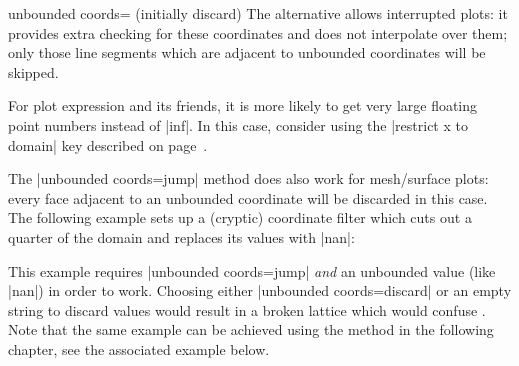 {\begin{pgfplotskey}{unbounded coords= (initially discard)}
    The alternative  allows interrupted plots: it provides
    extra checking for these coordinates and does not interpolate over them;
    only those line segments which are adjacent to unbounded coordinates will
    be skipped.
\begin{codeexample}[]
\end{codeexample}

    For plot expression and its friends, it is more likely to get very large
    floating point numbers instead of |inf|. In this case, consider using the
    |restrict x to domain| key described on
    page~\pageref{key:restrict:x:to:domain}.

    The |unbounded coords=jump| method does also work for mesh/surface plots:
    every face adjacent to an unbounded coordinate will be discarded in this
    case. The following example sets up a (cryptic) coordinate filter which
    cuts out a quarter of the domain and replaces its values with |nan|:

\pgfplotsexpensiveexample
\begin{codeexample}[]
\end{codeexample}
    \noindent This example requires
    |unbounded coords=jump|
    \emph{and} an unbounded value (like |nan|) in order to work. Choosing either
    |unbounded coords=discard| or an empty string to discard values would
    result in a broken lattice which would confuse \PGFPlots{}. Note that the
    same example can be achieved using the method in the following chapter, see
    the associated example below.
\end{pgfplotskey}


}
